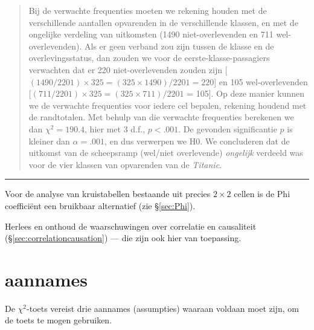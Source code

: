 \documentclass[
]{book}
\begin{document}
\begin{quote}
Bij de verwachte frequenties moeten we rekening houden met de
verschillende aantallen opvarenden in de verschillende klassen, en met
de ongelijke verdeling van uitkomsten (1490 niet-overlevenden en 711
wel-overlevenden). Als er geen verband zou zijn tussen de klasse en de
overlevingsstatus, dan zouden we voor de eerste-klasse-passagiers
verwachten dat er 220 niet-overlevenden zouden zijn
{[}\((1490/2201) \times 325 = (325 \times 1490) / 2201 = 220\){]} en 105
wel-overlevenden {[}\((711/2201) \times 325 = (325 \times 711) / 2201\) =
105{]}. Op deze manier kunnen we de verwachte frequenties voor iedere cel
bepalen, rekening houdend met de randtotalen. Met behulp van die
verwachte frequenties berekenen we dan \(\chi^2=190.4\), hier met 3 d.f.,
\(p<.001\). De gevonden significantie \(p\) is kleiner dan \(\alpha=.001\), en
dus verwerpen we H0. We concluderen dat de uitkomst van de scheepsramp
(wel/niet overlevende) \emph{ongelijk} verdeeld was voor de vier klassen van
opvarenden van de \emph{Titanic}.
\end{quote}

\begin{center}\rule{0.5\linewidth}{0.5pt}\end{center}

Voor de analyse van kruistabellen bestaande uit precies \(2\times2\)
cellen is de Phi coefficiënt een bruikbaar alternatief (zie
§\ref{sec:Phi}).

Herlees en onthoud de waarschuwingen over correlatie en causaliteit (§\ref{sec:correlationcausation})
--- die zijn ook hier van toepassing.

\section{aannames}\label{sec:chi2toets-aannames}

De \(\chi^2\)-toets vereist drie aannames (assumpties) waaraan voldaan moet zijn, om de
toets te mogen gebruiken.
\end{document}
